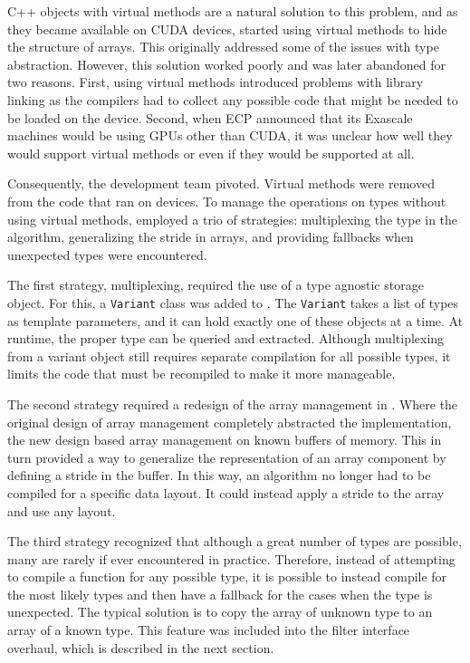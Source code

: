 C++ objects with virtual methods are a natural solution to this problem, and as they became available on CUDA devices, \vtkm started using virtual methods to hide the structure of arrays.
This originally addressed some of the issues with type abstraction.
However, this solution worked poorly and was later abandoned for two reasons.
First, using virtual methods introduced problems with library linking as the compilers had to collect any possible code that might be needed to be loaded on the device.
Second, when ECP announced that its Exascale machines would be using GPUs other than CUDA, it was unclear how well they would support virtual methods or even if they would be supported at all.

Consequently, the \vtkm development team pivoted.
Virtual methods were removed from the \vtkm code that ran on devices.
To manage the operations on types without using virtual methods, \vtkm employed a trio of strategies: multiplexing the type in the algorithm, generalizing the stride in arrays, and providing fallbacks when unexpected types were encountered.

The first strategy, multiplexing, required the use of a type agnostic storage object.
For this, a \texttt{Variant} class was added to \vtkm.
The \texttt{Variant} takes a list of types as template parameters, and it can hold exactly one of these objects at a time.
At runtime, the proper type can be queried and extracted.
Although multiplexing from a variant object still requires separate compilation for all possible types, it limits the code that must be recompiled to make it more manageable.

The second strategy required a redesign of the array management in \vtkm.
Where the original design of array management completely abstracted the implementation, the new design based array management on known buffers of memory.
This in turn provided a way to generalize the representation of an array component by defining a stride in the buffer.
In this way, an algorithm no longer had to be compiled for a specific data layout.
It could instead apply a stride to the array and use any layout.

The third strategy recognized that although a great number of types are possible, many are rarely if ever encountered in practice.
Therefore, instead of attempting to compile a function for any possible type, it is possible to instead compile for the most likely types and then have a fallback for the cases when the type is unexpected.
The typical solution is to copy the array of unknown type to an array of a known type.
This feature was included into the filter interface overhaul, which is described in the next section.

